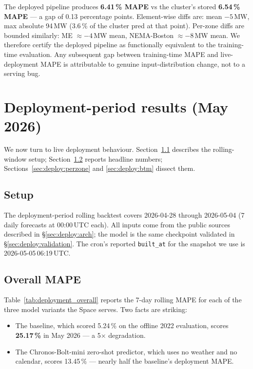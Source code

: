The deployed pipeline produces \textbf{6.41\,\% MAPE} vs the cluster's stored \textbf{6.54\,\% MAPE} --- a gap of 0.13 percentage points. Element-wise diffs are: mean $-5$\,MW, max absolute 94\,MW (3.6\,\% of the cluster pred at that point). Per-zone diffs are bounded similarly: ME $\approx -4$\,MW mean, NEMA-Boston $\approx -8$\,MW mean. We therefore certify the deployed pipeline as functionally equivalent to the training-time evaluation. Any subsequent gap between training-time MAPE and live-deployment MAPE is attributable to genuine input-distribution change, not to a serving bug.

\section{Deployment-period results (May 2026)}
\label{sec:deploy:results}

We now turn to live deployment behaviour. Section~\ref{sec:deploy:setup} describes the rolling-window setup; Section~\ref{sec:deploy:overall} reports headline numbers; Sections~\ref{sec:deploy:perzone} and \ref{sec:deploy:btm} dissect them.

\subsection{Setup}
\label{sec:deploy:setup}

The deployment-period rolling backtest covers 2026-04-28 through 2026-05-04 (7 daily forecasts at 00:00\,UTC each). All inputs come from the public sources described in \S\ref{sec:deploy:arch}; the model is the same checkpoint validated in \S\ref{sec:deploy:validation}. The cron's reported \texttt{built\_at} for the snapshot we use is 2026-05-05\,06:19\,UTC.

\subsection{Overall MAPE}
\label{sec:deploy:overall}

Table~\ref{tab:deployment_overall} reports the 7-day rolling MAPE for each of the three model variants the Space serves. Two facts are striking:

\begin{itemize}\setlength\itemsep{1pt}
  \item The baseline, which scored 5.24\,\% on the offline 2022 evaluation, scores \textbf{25.17\,\%} in May 2026 --- a 5$\times$ degradation.
  \item The Chronos-Bolt-mini zero-shot predictor, which uses no weather and no calendar, scores 13.45\,\% --- nearly half the baseline's deployment MAPE.
\end{itemize}

